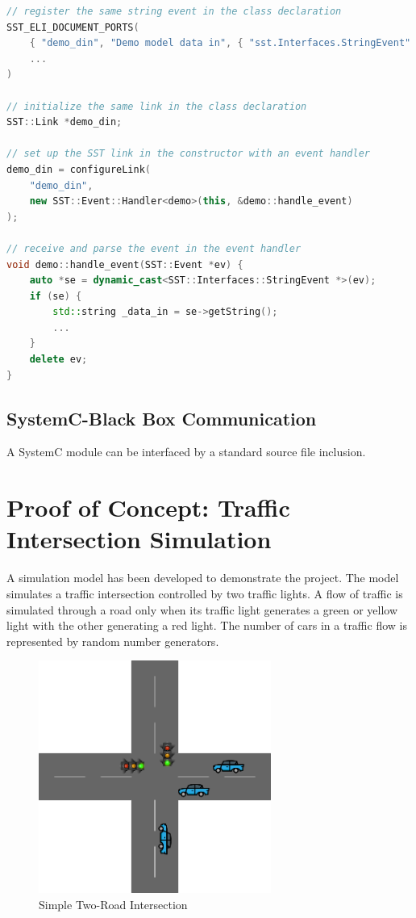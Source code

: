 \documentclass{article}
\begin{document}
\begin{lstlisting}[language=C++, caption={Snippet of \lstinline{blackboxes/demo_comp.cpp}}, captionpos=b]
// register the same string event in the class declaration
SST_ELI_DOCUMENT_PORTS(
    { "demo_din", "Demo model data in", { "sst.Interfaces.StringEvent" }},
    ...
)

// initialize the same link in the class declaration
SST::Link *demo_din;

// set up the SST link in the constructor with an event handler
demo_din = configureLink(
    "demo_din",
    new SST::Event::Handler<demo>(this, &demo::handle_event)
);

// receive and parse the event in the event handler
void demo::handle_event(SST::Event *ev) {
    auto *se = dynamic_cast<SST::Interfaces::StringEvent *>(ev);
    if (se) {
        std::string _data_in = se->getString();
        ...
    }
    delete ev;
}
\end{lstlisting}

    \subsection{SystemC-Black Box Communication}
    A SystemC module can be interfaced by a standard source file inclusion.

  \section{Proof of Concept: Traffic Intersection Simulation}
  A simulation model has been developed to demonstrate the project. The model simulates a traffic
  intersection controlled by two traffic lights. A flow of traffic is simulated through a road only
  when its traffic light generates a green or yellow light with the other generating a red light.
  The number of cars in a traffic flow is represented by random number generators.

  \begin{figure}[!h]
    \centering
    \includegraphics[width=3in]{diagrams/intersection.png}
    \caption{Simple Two-Road Intersection}
    \label{fig:intersection}
  \end{figure}
\end{document}
